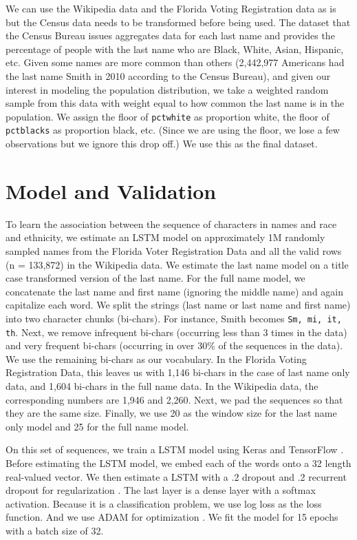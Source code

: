 \documentclass[12pt, letterpaper]{article}
\begin{document}
We can use the Wikipedia data and the Florida Voting Registration data as is but the Census data needs to be transformed before being used. The dataset that the Census Bureau issues aggregates data for each last name and provides the percentage of people with the last name who are Black, White, Asian, Hispanic, etc. Given some names are more common than others (2,442,977 Americans had the last name Smith in 2010 according to the Census Bureau), and given our interest in modeling the population distribution, we take a weighted random sample from this data with weight equal to how common the last name is in the population. We assign the floor of \texttt{pctwhite} as proportion white, the floor of \texttt{pctblacks} as proportion black, etc. (Since we are using the floor, we lose a few observations but we ignore this drop off.) We use this as the final dataset.

\section*{Model and Validation}
To learn the association between the sequence of characters in names and race and ethnicity, we estimate an LSTM model \citep{graves2005framewise, gers1999learning} on approximately 1M randomly sampled names from the Florida Voter Registration Data and all the valid rows (n = 133,872) in the Wikipedia data. We estimate the last name model on a title case transformed version of the last name. For the full name model, we concatenate the last name and first name (ignoring the middle name) and again capitalize each word. We split the strings (last name or last name and first name) into two character chunks (bi-chars). For instance, Smith becomes {\tt Sm, mi, it, th}. Next, we remove infrequent bi-chars (occurring less than 3 times in the data) and very frequent bi-chars (occurring in over 30\% of the sequences in the data). We use the remaining bi-chars as our vocabulary. In the Florida Voting Registration Data, this leaves us with 1,146 bi-chars in the case of last name only data, and 1,604 bi-chars in the full name data. In the Wikipedia data, the corresponding numbers are 1,946 and 2,260. Next, we pad the sequences so that they are the same size. Finally, we use 20 as the window size for the last name only model and 25 for the full name model. 

On this set of sequences, we train a LSTM model using Keras \citep{chollet2015keras} and TensorFlow \citep{abadi2016tensorflow}. Before estimating the LSTM model, we embed each of the words onto a 32 length real-valued vector. We then estimate a LSTM with a .2 dropout and .2 recurrent dropout for regularization \citep{srivastava2014dropout}. The last layer is a dense layer with a softmax activation. Because it is a classification problem, we use log loss as the loss function. And we use ADAM for optimization \citep{kingma2014adam}. We fit the model for 15 epochs with a batch size of 32.
\end{document}
